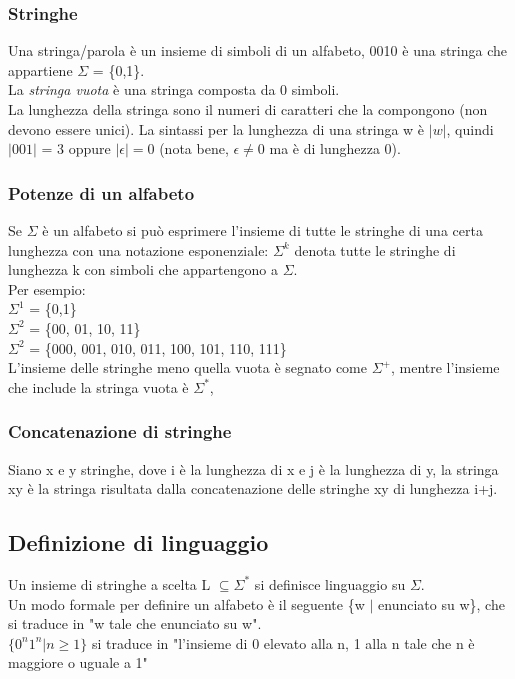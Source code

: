 \documentclass[12pt]{article}
\begin{document}
\subsubsection{Stringhe}
Una stringa/parola è un insieme di simboli di un alfabeto, 0010 è una stringa che appartiene $\Sigma$ = \{0,1\}.
\\ La \emph{stringa vuota} è una stringa composta da 0 simboli.
\\ La lunghezza della stringa sono il numeri di caratteri che la compongono (non devono essere unici). La sintassi per la lunghezza di una stringa w è $|w|$, quindi $|001|$ = 3 oppure $|\epsilon| = 0$ (nota bene, $\epsilon \ne 0$ ma è di lunghezza 0).

\subsubsection*{Potenze di un alfabeto}
Se $\Sigma$ è un alfabeto si può esprimere l'insieme di tutte le stringhe di una certa lunghezza con una notazione esponenziale: $\Sigma^k$ denota tutte le stringhe di lunghezza k con simboli che appartengono a $\Sigma$. \\
Per esempio:
\\ $\Sigma^1$ = \{0,1\}
\\ $\Sigma^2$ = \{00, 01, 10, 11\}
\\ $\Sigma^2$ = \{000, 001, 010, 011, 100, 101, 110, 111\}
\\ L'insieme delle stringhe meno quella vuota è segnato come $\Sigma^+$, mentre l'insieme che include la stringa vuota è $\Sigma^*$,

\subsubsection{Concatenazione di stringhe}
Siano x e y stringhe, dove i è la lunghezza di x e j è la lunghezza di y, la stringa xy è la stringa risultata dalla concatenazione delle stringhe xy di lunghezza i+j.

\subsection{Definizione di linguaggio}
Un insieme di stringhe a scelta L $\subseteq\Sigma^*$ si definisce linguaggio su $\Sigma$.
\\ Un modo formale per definire un alfabeto è il seguente \{w $|$ enunciato su w\}, che si traduce in "w tale che enunciato su w".
\\ $\{0^n 1^n | n \ge 1 \}$ si traduce in "l’insieme di 0 elevato alla n, 1 alla n tale che n è maggiore o uguale a 1"
\end{document}
